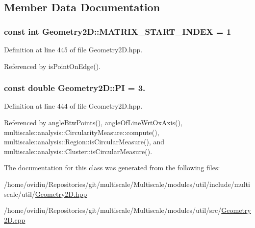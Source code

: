 \subsection{\-Member \-Data \-Documentation}
\hypertarget{classmultiscale_1_1Geometry2D_ade1d55d3ef110b73d42a3e4c4360ba17}{
\subsubsection[{\-M\-A\-T\-R\-I\-X\-\_\-\-S\-T\-A\-R\-T\-\_\-\-I\-N\-D\-E\-X}]{\setlength{\rightskip}{0pt plus 5cm}const int {\bf \-Geometry2\-D\-::\-M\-A\-T\-R\-I\-X\-\_\-\-S\-T\-A\-R\-T\-\_\-\-I\-N\-D\-E\-X} = 1}}\label{classmultiscale_1_1Geometry2D_ade1d55d3ef110b73d42a3e4c4360ba17}


\-Definition at line 445 of file \-Geometry2\-D.\-hpp.



\-Referenced by is\-Point\-On\-Edge().

\hypertarget{classmultiscale_1_1Geometry2D_a7039b8bbe89283e22744c0631d597660}{
\subsubsection[{\-P\-I}]{\setlength{\rightskip}{0pt plus 5cm}const double {\bf \-Geometry2\-D\-::\-P\-I} = 3.}}\label{classmultiscale_1_1Geometry2D_a7039b8bbe89283e22744c0631d597660}


\-Definition at line 444 of file \-Geometry2\-D.\-hpp.



\-Referenced by angle\-Btw\-Points(), angle\-Of\-Line\-Wrt\-Ox\-Axis(), multiscale\-::analysis\-::\-Circularity\-Measure\-::compute(), multiscale\-::analysis\-::\-Region\-::is\-Circular\-Measure(), and multiscale\-::analysis\-::\-Cluster\-::is\-Circular\-Measure().



\-The documentation for this class was generated from the following files\-:\begin{DoxyCompactItemize}
\item 
/home/ovidiu/\-Repositories/git/multiscale/\-Multiscale/modules/util/include/multiscale/util/\hyperlink{Geometry2D_8hpp}{\-Geometry2\-D.\-hpp}\item 
/home/ovidiu/\-Repositories/git/multiscale/\-Multiscale/modules/util/src/\hyperlink{Geometry2D_8cpp}{\-Geometry2\-D.\-cpp}\end{DoxyCompactItemize}
